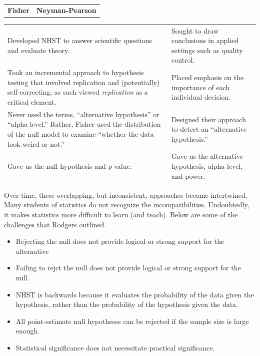\documentclass[
  11pt,
]{book}
\providecommand{\tightlist}{%
  \setlength{\itemsep}{0pt}\setlength{\parskip}{0pt}}
\begin{document}
\begin{longtable}[]{@{}
  >{\centering\arraybackslash}p{}
  >{\centering\arraybackslash}p{}@{}}
\toprule\noalign{}
\endhead
\bottomrule\noalign{}
\endlastfoot
\textbf{Fisher} & \textbf{Neyman-Pearson} \\
\end{longtable}

\begin{longtable}[]{@{}
  >{\raggedright\arraybackslash}p{}
  >{\raggedright\arraybackslash}p{}@{}}
\toprule\noalign{}
\endhead
\bottomrule\noalign{}
\endlastfoot
Developed NHST to answer scientific questions and evaluate theory. & Sought to draw conclusions in applied settings such as quality control. \\
Took an incremental approach to hypothesis testing that involved replication and (potentially) self-correcting; as such viewed \emph{replication} as a critical element. & Placed emphasis on the importance of each individual decision. \\
Never used the terms, ``alternative hypothesis'' or ``alpha level.'' Rather, Fisher used the distribution of the null model to examine ``whether the data look weird or not.'' & Designed their approach to detect an ``alternative hypothesis.'' \\
Gave us the null hypothesis and \emph{p} value. & Gave us the alternative hypothesis, alpha level, and power. \\
\end{longtable}

Over time, these overlapping, but inconsistent, approaches became intertwined. Many students of statistics do not recognize the incompatibilities. Undoubtedly, it makes statistics more difficult to learn (and teach). Below are some of the challenges that Rodgers \citeyearpar{rodgers_epistemology_2010} outlined.

\begin{itemize}
\tightlist
\item
  Rejecting the null does not provide logical or strong support for the alternative
\item
  Failing to rejct the null does not provide logical or strong support for the null.
\item
  NHST is backwards because it evaluates the probability of the data given the hypothesis, rather than the probability of the hypothesis given the data.
\item
  All point-estimate null hypotheses can be rejected if the sample size is large enough.
\item
  Statistical significance does not necessitate practical significance.
\end{itemize}
\end{document}
